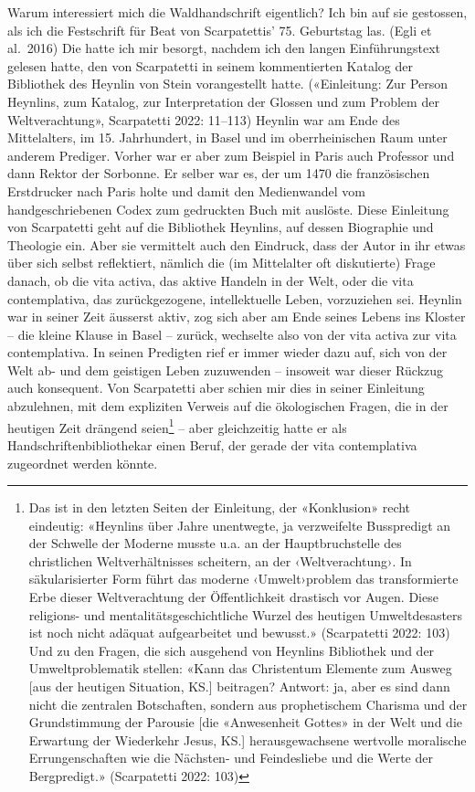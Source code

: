 \documentclass[a4paper,
fontsize=11pt,
oneside,
numbers=noperiodatend,
parskip=half-,
bibliography=totoc,
final
]{scrartcl}
\begin{document}
Warum interessiert mich die Waldhandschrift eigentlich? Ich bin auf sie
gestossen, als ich die Festschrift für Beat von Scarpatettis' 75.
Geburtstag las. (Egli et al.~2016) Die hatte ich mir besorgt, nachdem
ich den langen Einführungstext gelesen hatte, den von Scarpatetti in seinem
kommentierten Katalog der Bibliothek des Heynlin von Stein vorangestellt
hatte. («Einleitung: Zur Person Heynlins, zum Katalog, zur
Interpretation der Glossen und zum Problem der Weltverachtung»,
Scarpatetti 2022: 11--113) Heynlin war am Ende des Mittelalters, im 15.
Jahrhundert, in Basel und im oberrheinischen Raum unter anderem
Prediger. Vorher war er aber zum Beispiel in Paris auch Professor und
dann Rektor der Sorbonne. Er selber war es, der um 1470 die
französischen Erstdrucker nach Paris holte und damit den Medienwandel
vom handgeschriebenen Codex zum gedruckten Buch mit auslöste. Diese
Einleitung von Scarpatetti geht auf die Bibliothek Heynlins, auf dessen
Biographie und Theologie ein. Aber sie vermittelt auch den Eindruck,
dass der Autor in ihr etwas über sich selbst reflektiert, nämlich die
(im Mittelalter oft diskutierte) Frage danach, ob die vita activa, das
aktive Handeln in der Welt, oder die vita contemplativa, das
zurückgezogene, intellektuelle Leben, vorzuziehen sei. Heynlin war in
seiner Zeit äusserst aktiv, zog sich aber am Ende seines Lebens ins
Kloster -- die kleine Klause in Basel -- zurück, wechselte also von der
vita activa zur vita contemplativa. In seinen Predigten rief er immer
wieder dazu auf, sich von der Welt ab- und dem geistigen Leben
zuzuwenden -- insoweit war dieser Rückzug auch konsequent. Von Scarpatetti
aber schien mir dies in seiner Einleitung abzulehnen, mit dem expliziten
Verweis auf die ökologischen Fragen, die in der heutigen Zeit drängend
seien\footnote{Das ist in den letzten Seiten der Einleitung, der
  «Konklusion» recht eindeutig: «Heynlins über Jahre unentwegte, ja
  verzweifelte Busspredigt an der Schwelle der Moderne musste u.a. an
  der Hauptbruchstelle des christlichen Weltverhältnisses scheitern, an
  der ‹Weltverachtung›. In säkularisierter Form führt das moderne
  ‹Umwelt›problem das transformierte Erbe dieser Weltverachtung der
  Öffentlichkeit drastisch vor Augen. Diese religions- und
  mentalitätsgeschichtliche Wurzel des heutigen Umweltdesasters ist noch
  nicht adäquat aufgearbeitet und bewusst.» (Scarpatetti 2022: 103) Und
  zu den Fragen, die sich ausgehend von Heynlins Bibliothek und der
  Umweltproblematik stellen: «Kann das Christentum Elemente zum Ausweg
  {[}aus der heutigen Situation, KS.{]} beitragen? Antwort: ja, aber es
  sind dann nicht die zentralen Botschaften, sondern aus prophetischem
  Charisma und der Grundstimmung der Parousie {[}die «Anwesenheit
  Gottes» in der Welt und die Erwartung der Wiederkehr Jesus, KS.{]}
  herausgewachsene wertvolle moralische Errungenschaften wie die
  Nächsten- und Feindesliebe und die Werte der Bergpredigt.»
  (Scarpatetti 2022: 103)} -- aber gleichzeitig hatte er als
Handschriftenbibliothekar einen Beruf, der gerade der vita contemplativa
zugeordnet werden könnte.
\end{document}
